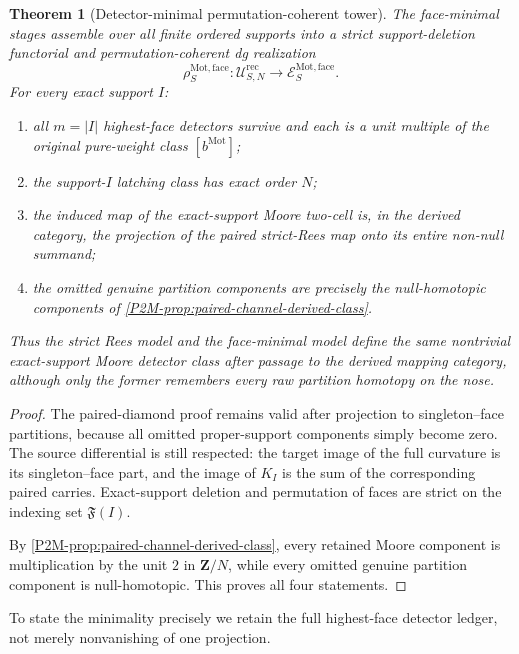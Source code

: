 \documentclass[11pt]{article}
\newtheorem{theorem}{Theorem}[section]
\theoremstyle{remark}
\newcommand{\Z}{\mathbf Z}
\newcommand{\Mot}{\mathrm{Mot}}
\begin{document}
\begin{theorem}[Detector-minimal permutation-coherent tower]
\label{P2M-thm:detector-minimal-tower}
The face-minimal stages assemble over all finite ordered supports into a strict
support-deletion functorial and permutation-coherent dg realization
\[
 \rho_S^{\Mot,\mathrm{face}}:
 \mathscr U^{\mathrm{rec}}_{S,N}
 \longrightarrow
 \mathscr E_S^{\Mot,\mathrm{face}}.
\]
For every exact support $I$:
\begin{enumerate}[label=\textup{(\roman*)}]
\item all $m=|I|$ highest-face detectors survive and each is a unit multiple
      of the original pure-weight class $[b^{\Mot}]$;
\item the support-$I$ latching class has exact order $N$;
\item the induced map of the exact-support Moore two-cell is, in the derived
      category, the projection of the paired strict-Rees map onto its entire
      non-null summand;
\item the omitted genuine partition components are precisely the
      null-homotopic components of
      \cref{P2M-prop:paired-channel-derived-class}.
\end{enumerate}
Thus the strict Rees model and the face-minimal model define the same
nontrivial exact-support Moore detector class after passage to the derived
mapping category, although only the former remembers every raw partition
homotopy on the nose.
\end{theorem}

\begin{proof}
The paired-diamond proof remains valid after projection to singleton--face
partitions, because all omitted proper-support components simply become zero.
The source differential is still respected: the target image of the full
curvature is its singleton--face part, and the image of $K_I$ is the sum of
the corresponding paired carries.  Exact-support deletion and permutation of
faces are strict on the indexing set $\mathfrak F(I)$.

By \cref{P2M-prop:paired-channel-derived-class}, every retained Moore component is
multiplication by the unit $2$ in $\Z/N$, while every omitted genuine
partition component is null-homotopic.  This proves all four statements.
\end{proof}

To state the minimality precisely we retain the full highest-face detector
ledger, not merely nonvanishing of one projection.
\end{document}
